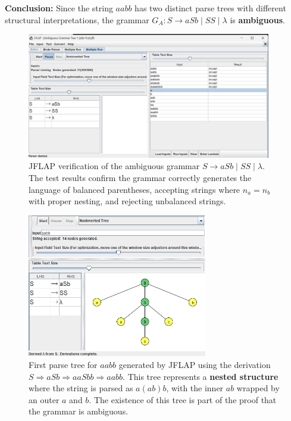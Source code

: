 \documentclass[12pt]{article}
\begin{document}
\textbf{Conclusion:} Since the string $aabb$ has two distinct parse trees with different structural interpretations, the grammar $G_A: S \rightarrow aSb \mid SS \mid \lambda$ is \textbf{ambiguous}.

\begin{figure}[H]
\centering
\includegraphics[width=0.95\textwidth]{Problem 4/Ambiguous Grammar Tree 1 (aSb First)-Tests-BlowUp.png}
\caption{JFLAP verification of the ambiguous grammar $S \rightarrow aSb \mid SS \mid \lambda$. The test results confirm the grammar correctly generates the language of balanced parentheses, accepting strings where $n_a = n_b$ with proper nesting, and rejecting unbalanced strings.}
\label{fig:problem4_tests}
\end{figure}

\begin{figure}[H]
\centering
\includegraphics[width=0.7\textwidth]{Problem 4/Ambiguous Grammar Tree 1 (aSb First).png}
\caption{First parse tree for $aabb$ generated by JFLAP using the derivation $S \Rightarrow aSb \Rightarrow aaSbb \Rightarrow aabb$. This tree represents a \textbf{nested structure} where the string is parsed as $a(ab)b$, with the inner $ab$ wrapped by an outer $a$ and $b$. The existence of this tree is part of the proof that the grammar is ambiguous.}
\label{fig:problem4_tree1}
\end{figure}
\end{document}
